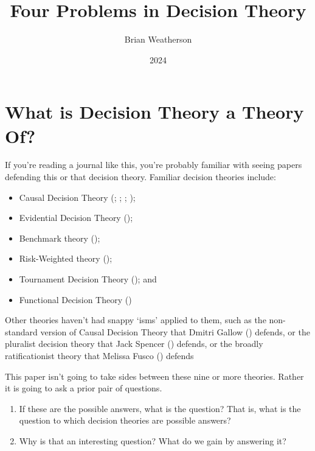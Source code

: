 \documentclass[
  11pt,
  letterpaper,
  DIV=11,
  numbers=noendperiod,
  oneside]{scrartcl}
\title{Four Problems in Decision Theory}
\author{Brian Weatherson}
\date{2024}
\providecommand{\tightlist}{%
  \setlength{\itemsep}{0pt}\setlength{\parskip}{0pt}}\usepackage{longtable,booktabs,array}
\begin{document}
\maketitle

\section{What is Decision Theory a Theory
Of?}\label{what-is-decision-theory-a-theory-of}

If you're reading a journal like this, you're probably familiar with
seeing papers defending this or that decision theory. Familiar decision
theories include:

\begin{itemize}
\tightlist
\item
  Causal Decision Theory (; ;
  ; );
\item
  Evidential Decision Theory ();
\item
  Benchmark theory ();
\item
  Risk-Weighted theory ();
\item
  Tournament Decision Theory (); and
\item
  Functional Decision Theory
  ()
\end{itemize}

Other theories haven't had snappy `isms' applied to them, such as the
non-standard version of Causal Decision Theory that Dmitri Gallow
() defends, or the pluralist decision
theory that Jack Spencer () defends, or
the broadly ratificationist theory that Melissa Fusco
() defends

This paper isn't going to take sides between these nine or more
theories. Rather it is going to ask a prior pair of
questions.

\begin{enumerate}
\def\labelenumi{\arabic{enumi}.}
\tightlist
\item
  If these are the possible answers, what is the question? That is, what
  is the question to which decision theories are possible answers?
\item
  Why is that an interesting question? What do we gain by answering it?
\end{enumerate}
\end{document}
